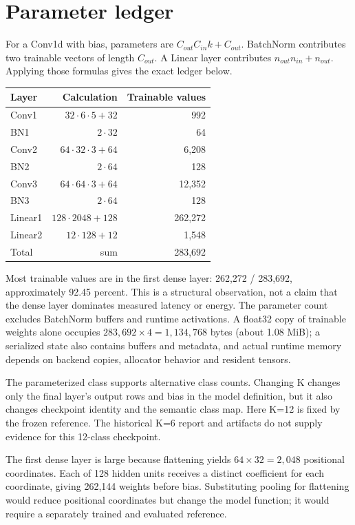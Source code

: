 \documentclass[11pt,a4paper]{article}
\begin{document}
\section{Parameter ledger}
For a Conv1d with bias, parameters are $C_{out}C_{in}k+C_{out}$. BatchNorm contributes two trainable vectors of length $C_{out}$. A Linear layer contributes $n_{out}n_{in}+n_{out}$. Applying those formulas gives the exact ledger below.
\begin{center}\begin{tabular}{@{}lrr@{}}\toprule Layer & Calculation & Trainable values\\\midrule
Conv1 & $32\cdot6\cdot5+32$ & 992\\
BN1 & $2\cdot32$ & 64\\
Conv2 & $64\cdot32\cdot3+64$ & 6,208\\
BN2 & $2\cdot64$ & 128\\
Conv3 & $64\cdot64\cdot3+64$ & 12,352\\
BN3 & $2\cdot64$ & 128\\
Linear1 & $128\cdot2048+128$ & 262,272\\
Linear2 & $12\cdot128+12$ & 1,548\\\midrule
Total & sum & 283,692\\\bottomrule\end{tabular}\end{center}
Most trainable values are in the first dense layer: 262,272 / 283,692, approximately 92.45 percent. This is a structural observation, not a claim that the dense layer dominates measured latency or energy. The parameter count excludes BatchNorm buffers and runtime activations. A float32 copy of trainable weights alone occupies $283,692\times4=1,134,768$ bytes (about 1.08 MiB); a serialized state also contains buffers and metadata, and actual runtime memory depends on backend copies, allocator behavior and resident tensors.

The parameterized class supports alternative class counts. Changing K changes only the final layer's output rows and bias in the model definition, but it also changes checkpoint identity and the semantic class map. Here K=12 is fixed by the frozen reference. The historical K=6 report and artifacts do not supply evidence for this 12-class checkpoint.

The first dense layer is large because flattening yields $64\times32=2,048$ positional coordinates. Each of 128 hidden units receives a distinct coefficient for each coordinate, giving 262,144 weights before bias. Substituting pooling for flattening would reduce positional coordinates but change the model function; it would require a separately trained and evaluated reference.
\end{document}
